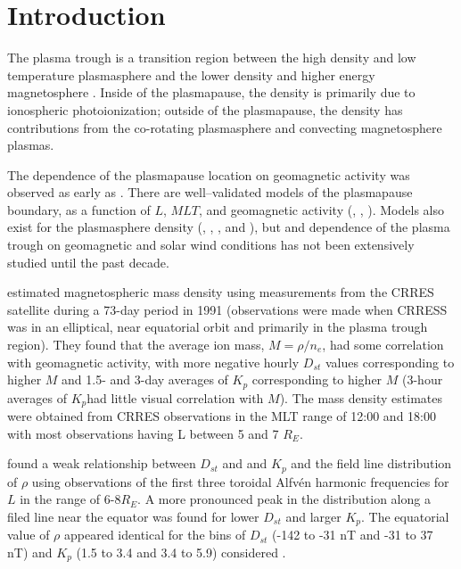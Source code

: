 \documentclass[10pt,twocolumn]{article}
\begin{document}
\saythanks

\section{Introduction}

The plasma trough is a transition region between the high density and low temperature plasmasphere and the lower density and higher energy magnetosphere \citep{Mayr1968ModelMagnetosphereTemperature}.  Inside of the plasmapause, the density is primarily due to ionospheric photoionization; outside of the plasmapause, the density has contributions from the co-rotating plasmasphere and convecting magnetosphere plasmas.

The dependence of the plasmapause location on geomagnetic activity was observed as early as \cite{Carpenter1966}.  There are well--validated models of the plasmapause boundary, as a function of $L$, $MLT$, and geomagnetic activity (\cite{LemaireEarthsPlasmasphere}, \cite{Moldwin2002ModelPlasmapause}, \cite{OBrien2003EmpiricalPlasmapause}).  Models also exist for the plasmasphere density (\cite{Gallagher1988EmpiricalModelPlasmasphere}, \cite{LemaireEarthsPlasmasphere}, \cite{Takahashi2006}, and \cite{Takahashi2010}), but and dependence of the plasma trough on geomagnetic and solar wind conditions has not been extensively studied until the past decade.

\cite{Takahashi2006} estimated magnetospheric mass density using measurements from the CRRES satellite during a 73-day period in 1991 (observations were made when CRRESS was in an elliptical, near equatorial orbit and primarily in the plasma trough region). They found that the average ion mass, $M=\rho/n_e$, had some correlation with geomagnetic activity, with more negative hourly $D_{st}$ values corresponding to higher $M$ and 1.5- and 3-day averages of $K_p$ corresponding to higher $M$ (3-hour averages of $K_p$had little visual correlation with $M$). The mass density estimates were obtained from CRRES observations in the MLT range of 12:00 and 18:00 with most observations having L between 5 and 7 $R_E$.

\cite{Denton2006} found a weak relationship between $D_{st}$ and and $K_p$ and the field line distribution of $\rho$ using observations of the first three toroidal Alfvén harmonic frequencies for $L$ in the range of 6-8$R_E$.  A more pronounced peak in the distribution along a filed line near the equator was found for lower $D_{st}$ and larger $K_p$.  The equatorial value of $\rho$ appeared identical for the bins of $D_{st}$ (-142 to -31 nT and -31 to 37 nT) and $K_p$ (1.5 to 3.4 and 3.4 to 5.9) considered .
\end{document}
